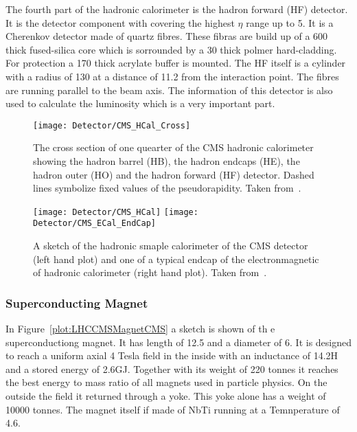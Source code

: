 The fourth part of the hadronic calorimeter is the hadron forward (HF) detector. It is the detector component with covering the  highest $\eta{}$ range up to 5. It is a Cherenkov detector made of quartz fibres. These fibras are build up of a 600\mum{} thick fused-silica core which is sorrounded by a 30\mum{} thick polmer hard-cladding. For protection a 170\mum{} thick acrylate buffer is mounted. The HF itself is a cylinder with a radius of 130\cm{} at a distance of 11.2\m{} from the interaction point. The fibres are running parallel to the beam axis. The information of this detector is also used to calculate the luminosity which is a very important part.

\begin{figure}[!Hhtb]
    \centering
    \texttt{[image: Detector/CMS\_HCal\_Cross]}
    \caption[Cross section of the CMS hadronic calorimeter]{The cross section of one quearter of the CMS hadronic calorimeter showing the hadron barrel (HB), the hadron endcaps (HE), the hadron outer (HO) and the hadron forward (HF) detector. Dashed lines symbolize fixed values of the pseudorapidity. Taken from~. \label{plot:LHCCMSHCalCross}}
\end{figure}

\begin{figure}[!Hhtb]
  \centering
  \texttt{[image: Detector/CMS\_HCal]}
  \texttt{[image: Detector/CMS\_ECal\_EndCap]}
  \caption[Sketches of the hadronic calorimeter of CMS]{A sketch of the hadronic smaple calorimeter of the CMS detector (left hand plot) and one of a typical endcap of the electronmagnetic of hadronic calorimeter (right hand plot). Taken from~. \label{plot:LHCCMSHCalCMS}}
\end{figure}

\subsubsection{Superconducting Magnet}

In Figure~\ref{plot:LHCCMSMagnetCMS} a sketch is shown of th e superconductiong magnet. It has length of 12.5\m{} and a diameter of 6\m{}. It is designed to reach a uniform axial 4 Tesla field in the inside with an inductance of 14.2\unit{H} and a stored energy of 2.6\unit{GJ}. Together with its weight of 220 tonnes it reaches the best energy to mass ratio of all magnets used in particle physics. On the outside the field it returned through a yoke. This yoke alone has a weight of 10000 tonnes. The magnet itself if made of NbTi running at a Temnperature of 4.6\K{}.

